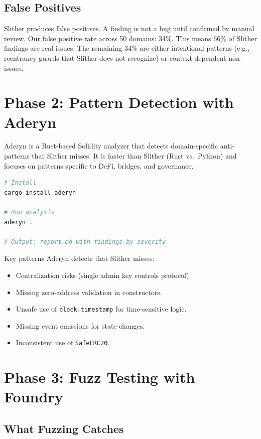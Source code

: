 \documentclass[11pt,a4paper]{article}
\begin{document}
\subsection{False Positives}

Slither produces false positives. A finding is not a bug until confirmed by manual
review. Our false positive rate across 50 domains: 34\%. This means 66\% of Slither
findings are real issues. The remaining 34\% are either intentional patterns
(e.g., reentrancy guards that Slither does not recognize) or context-dependent
non-issues.

\section{Phase 2: Pattern Detection with Aderyn}

Aderyn is a Rust-based Solidity analyzer that detects domain-specific anti-patterns
that Slither misses. It is faster than Slither (Rust vs.\ Python) and focuses on
patterns specific to DeFi, bridges, and governance.

\begin{lstlisting}[language=bash,caption={Running Aderyn}]
# Install
cargo install aderyn

# Run analysis
aderyn .

# Output: report.md with findings by severity
\end{lstlisting}

Key patterns Aderyn detects that Slither misses:
\begin{itemize}[nosep]
  \item Centralization risks (single admin key controls protocol).
  \item Missing zero-address validation in constructors.
  \item Unsafe use of \texttt{block.timestamp} for time-sensitive logic.
  \item Missing event emissions for state changes.
  \item Inconsistent use of \texttt{SafeERC20}.
\end{itemize}

\section{Phase 3: Fuzz Testing with Foundry}

\subsection{What Fuzzing Catches}
\end{document}
